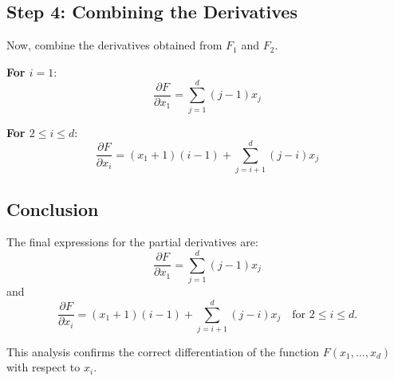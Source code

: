 \documentclass[11pt]{article}
\begin{document}
\subsection*{Step 4: Combining the Derivatives}

Now, combine the derivatives obtained from \( F_1 \) and \( F_2 \).

\textbf{For \( i = 1 \)}:
\[
\frac{\partial F}{\partial x_1} = \sum\limits_{j=1}^{d} (j - 1) x_j
\]

\textbf{For \( 2 \leq i \leq d \)}:
\[
\frac{\partial F}{\partial x_i} = (x_1 + 1)(i - 1) + \sum\limits_{j=i+1}^d (j - i) x_j
\]

\subsection*{Conclusion}

The final expressions for the partial derivatives are:
\[
\frac{\partial F}{\partial x_1} = \sum\limits_{j=1}^{d} (j - 1) x_j
\]
and
\[
\frac{\partial F}{\partial x_i} = (x_1 + 1)(i - 1) + \sum\limits_{j=i+1}^d (j - i) x_j \quad \text{for } 2 \leq i \leq d.
\]

This analysis confirms the correct differentiation of the function \( F(x_1, \dots, x_d) \) with respect to \( x_i \).
\end{document}

